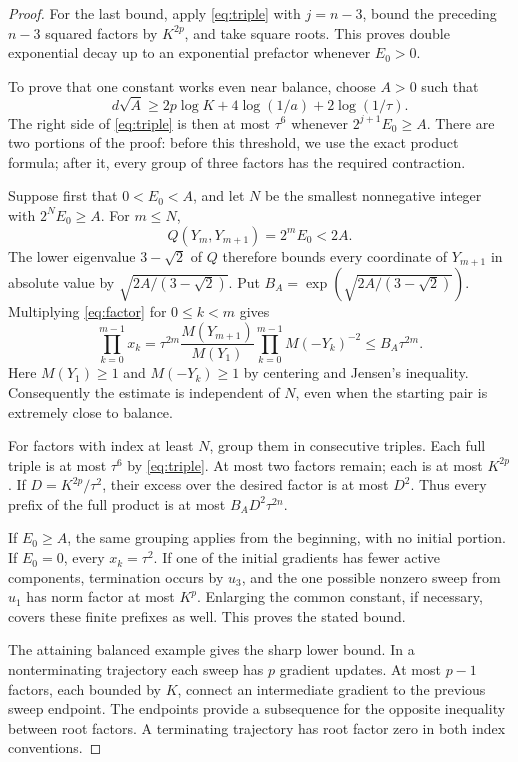 \documentclass[11pt,a4paper]{article}
\numberwithin{equation}{section}
\begin{document}
\begin{proof}
For the last bound, apply \eqref{eq:triple} with \(j=n-3\), bound the preceding \(n-3\) squared factors by \(K^{2p}\), and take square roots. This proves double exponential decay up to an exponential prefactor whenever \(E_0>0\).

To prove that one constant works even near balance, choose \(A>0\)
such that
\[
 d\sqrt A\ge 2p\log K+4\log(1/a)+2\log(1/\tau).
\]
The right side of \eqref{eq:triple} is then at most \(\tau^6\)
whenever \(2^{j+1}E_0\ge A\).
There are two portions of the proof: before this threshold, we use
the exact product formula; after it, every group of three factors has
the required contraction.

Suppose first that \(0<E_0<A\), and let \(N\) be the smallest
nonnegative integer with \(2^NE_0\ge A\). For \(m\le N\),
\[
 Q(Y_m,Y_{m+1})=2^mE_0<2A.
\]
The lower eigenvalue \(3-\sqrt2\) of \(Q\) therefore bounds every
coordinate of \(Y_{m+1}\) in absolute value by
\(\sqrt{2A/(3-\sqrt2)}\). Put
\(B_A=\exp(\sqrt{2A/(3-\sqrt2)})\).
Multiplying \eqref{eq:factor} for \(0\le k<m\) gives
\[
 \prod_{k=0}^{m-1}x_k
 =\tau^{2m}\frac{M(Y_{m+1})}{M(Y_1)}
       \prod_{k=0}^{m-1}M(-Y_k)^{-2}
 \le B_A\tau^{2m}.
\]
Here \(M(Y_1)\ge1\) and \(M(-Y_k)\ge1\) by centering and Jensen's
inequality. Consequently the estimate is independent of \(N\),
even when the starting pair is extremely close to balance.

For factors with index at least \(N\), group them in consecutive
triples. Each full triple is at most \(\tau^6\) by
\eqref{eq:triple}. At most two factors remain; each is at most
\(K^{2p}\). If \(D=K^{2p}/\tau^2\), their excess over the desired
factor is at most \(D^2\). Thus every prefix of the full product is
at most \(B_A D^2\tau^{2n}\).

If \(E_0\ge A\), the same grouping applies from the beginning,
with no initial portion. If \(E_0=0\), every \(x_k=\tau^2\).
If one of the initial gradients has fewer active components,
termination occurs by \(u_3\), and the one possible nonzero
sweep from \(u_1\) has norm factor at most \(K^p\).
Enlarging the common constant, if necessary, covers these finite
prefixes as well. This proves the stated bound.

The attaining balanced example gives the sharp lower bound. In a nonterminating trajectory each sweep has \(p\) gradient updates. At most \(p-1\) factors, each bounded by \(K\), connect an intermediate gradient to the previous sweep endpoint. The endpoints provide a subsequence for the opposite inequality between root factors. A terminating trajectory has root factor zero in both index conventions.
\end{proof}
\end{document}
